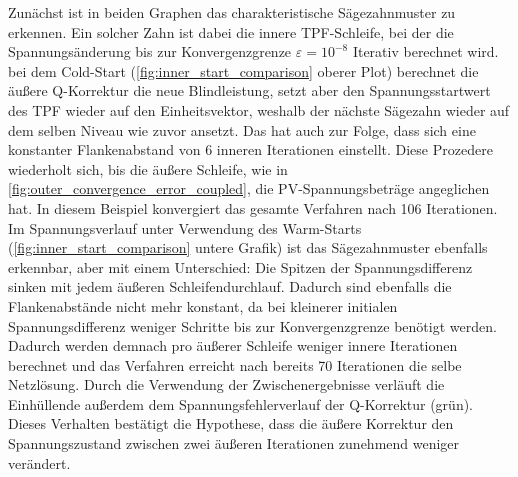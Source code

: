 Zunächst ist in beiden Graphen das charakteristische Sägezahnmuster zu erkennen.
Ein solcher Zahn ist dabei die innere TPF-Schleife, bei der die Spannungsänderung bis  zur Konvergenzgrenze $\varepsilon=10^{-8}$ Iterativ berechnet wird. 
bei dem Cold-Start (\ref{fig:inner_start_comparison} oberer Plot) berechnet die äußere Q-Korrektur die neue Blindleistung, setzt aber den Spannungsstartwert des TPF wieder auf den Einheitsvektor, weshalb der nächste Sägezahn wieder auf dem selben Niveau wie zuvor ansetzt.
Das hat auch zur Folge, dass sich eine konstanter Flankenabstand von 6 inneren Iterationen einstellt.
Diese Prozedere wiederholt sich, bis die äußere Schleife, wie in \cref{fig:outer_convergence_error_coupled}, die PV-Spannungsbeträge angeglichen hat.
In diesem Beispiel konvergiert das gesamte Verfahren nach 106 Iterationen.\\

Im Spannungsverlauf unter Verwendung des Warm-Starts (\ref{fig:inner_start_comparison} untere Grafik) ist das Sägezahnmuster ebenfalls erkennbar, aber mit einem Unterschied:
Die Spitzen der Spannungsdifferenz sinken mit jedem äußeren Schleifendurchlauf.
Dadurch sind ebenfalls die Flankenabstände nicht mehr konstant, da bei kleinerer initialen Spannungsdifferenz weniger Schritte bis zur Konvergenzgrenze benötigt werden.
Dadurch werden demnach pro äußerer Schleife weniger innere Iterationen berechnet und das Verfahren erreicht nach bereits 70 Iterationen die selbe Netzlösung.
Durch die Verwendung der Zwischenergebnisse verläuft die Einhüllende außerdem dem Spannungsfehlerverlauf der Q-Korrektur (grün).
Dieses Verhalten bestätigt die Hypothese, dass die äußere Korrektur den Spannungszustand zwischen zwei äußeren Iterationen zunehmend weniger verändert. \\



